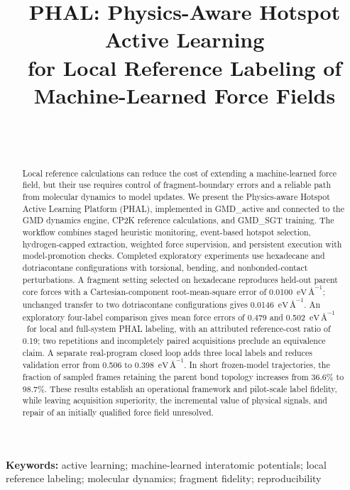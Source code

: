 \documentclass[11pt,a4paper]{article}
\title{PHAL: Physics-Aware Hotspot Active Learning\\
for Local Reference Labeling of Machine-Learned Force Fields}
\author{\PaperAuthors\\[0.4em]\small \PaperAffiliations\\\small \PaperContact}
\date{}
\newcommand{\forceunit}{\ensuremath{\mathrm{eV}\,\text{\AA}^{-1}}}
\begin{document}
\maketitle
\begin{abstract}
Local reference calculations can reduce the cost of extending a machine-learned
force field, but their use requires control of fragment-boundary errors and a
reliable path from molecular dynamics to model updates. We present the
Physics-aware Hotspot Active Learning Platform (PHAL), implemented in
GMD\_active and connected to the GMD dynamics engine, CP2K reference calculations,
and GMD\_SGT training. The workflow combines staged heuristic monitoring,
event-based hotspot selection, hydrogen-capped extraction, weighted force
supervision, and persistent execution with model-promotion checks.
Completed exploratory experiments use hexadecane and dotriacontane configurations
with torsional, bending, and nonbonded-contact perturbations. A fragment setting
selected on hexadecane reproduces held-out parent core forces with a
Cartesian-component root-mean-square error of 0.0100~\forceunit; unchanged
transfer to two dotriacontane configurations gives 0.0146~\forceunit.
An exploratory four-label comparison gives mean force errors of
0.479 and 0.502~\forceunit\ for local and full-system PHAL labeling, with
an attributed reference-cost ratio of 0.19; two repetitions and incompletely
paired acquisitions preclude an equivalence claim.
A separate real-program closed loop adds three local labels and reduces
validation error from 0.506 to 0.398~\forceunit. In short frozen-model
trajectories, the fraction of sampled frames retaining the parent bond topology
increases from 36.6\% to 98.7\%.
These results establish an operational framework and pilot-scale label fidelity,
while leaving acquisition superiority, the incremental value of physical
signals, and repair of an initially qualified force field unresolved.
\end{abstract}

\noindent\textbf{Keywords:} active learning; machine-learned interatomic potentials;
local reference labeling; molecular dynamics; fragment fidelity; reproducibility






\end{document}
